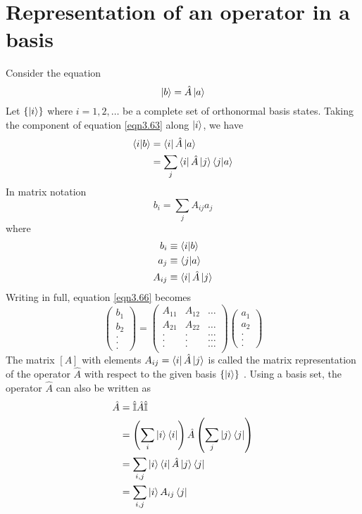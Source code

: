 \section{Representation of an operator in a basis}
Consider the equation
\begin{equation}\label{eqn3.63}
\ket{b} = \hat{A} \ket{a}
\end{equation}
Let $\{\ket{i} \}$ where $i=1,2,\ldots$ be a complete set of orthonormal basis states. Taking the component of equation \ref{eqn3.63} along $\ket{i}$,  we have
\begin{align}\label{eqn3.64-3.65}
	\braket{i}{b} &= \bra{i}\hat{A}\ket{a}\\
	&= \sum_{j} \bra{i}\hat{A}\ket{j}\braket{j}{a}
\end{align}
In matrix notation
\begin{equation}\label{eqn3.66}
b_i = \sum_{j} A_{i j} a_j
\end{equation}
where 
\begin{align}\label{eqn3.67-3.69}
	b_i &\equiv \braket{i}{b} \\
	a_j &\equiv \braket{j}{a} \\
	A_{i j} &\equiv	\bra{i}\hat{A}\ket{j}
\end{align}
Writing in full, equation \ref{eqn3.66} becomes
\begin{equation}\label{eqn3.70}
\left(
\begin{matrix}
b_1 \\ b_2 \\ . \\ . \\ .
\end{matrix}
\right) = \left(
\begin{matrix}
A_{11} & A_{12} & \ldots \\
A_{21} & A_{22} & \ldots \\
. & . & \ldots \\
. & . & \ldots \\
. & . & \ldots \\
\end{matrix}
\right) \left(
\begin{matrix}
a_1 \\ a_2 \\ . \\ . \\ .
\end{matrix}
\right)
\end{equation}
The matrix $[A]$ with elements $A_{i j} = \bra{i}\hat{A}\ket{j}$ is called the matrix representation of the operator $\hat{A}$ with respect to the given basis $\{\ket{i} \}$ . Using a basis set, the operator $\hat{A}$ can also be written as 
\begin{align}\label{eqn3.71-3.74}
	\hat{A} &= \hat{\mathbb{I}} \hat{A} \hat{\mathbb{I}} \\
	&= \left(\sum_{i}\ket{i}\bra{i} \right) \hat{A} \left(\sum_{j}\ket{j}\bra{j} \right)\\
	&= \sum_{i, j}\ket{i}\bra{i} \hat{A}\ket{j}\bra{j}\\
	&= \sum_{i, j}\ket{i} A_{i j} \bra{j}
\end{align}

